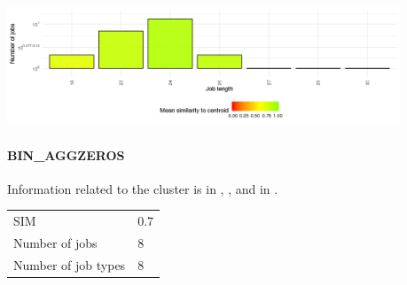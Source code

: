 \documentclass[]{llncs}
\begin{document}
  \label{tab:use_case:bin_all:top_jobs}
\endgroup

\begingroup
  \centering
  \includegraphics[width=4.61in,height=1.39in]{./media/image9.png}
  \label{fig:use_case:bin_all:length}
\endgroup
\paragraph{BIN\_AGGZEROS}
Information related to the cluster is in , , and in .

\begingroup
  \centering
  \begin{tabular}{ll}
    SIM & 0.7 \\
    Number of jobs & 8 \\
    Number of job types & 8 \\
  \end{tabular}
  \label{tab:use_case:bin_aggzeros:stats}
\endgroup
\end{document}
